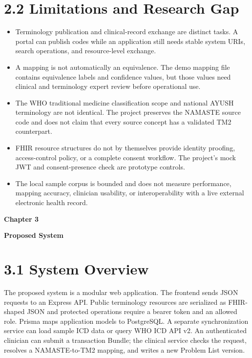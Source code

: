 \documentclass[12pt,a4paper,oneside]{report}
\begin{document}
\section*{2.2 Limitations and Research Gap}
\begin{itemize}
\item Terminology publication and clinical-record exchange are distinct tasks. A portal can publish codes while an application still needs stable system URIs, search operations, and resource-level exchange.
\item A mapping is not automatically an equivalence. The demo mapping file contains equivalence labels and confidence values, but those values need clinical and terminology expert review before operational use.
\item The WHO traditional medicine classification scope and national AYUSH terminology are not identical. The project preserves the NAMASTE source code and does not claim that every source concept has a validated TM2 counterpart.
\item FHIR resource structures do not by themselves provide identity proofing, access-control policy, or a complete consent workflow. The project's mock JWT and consent-presence check are prototype controls.
\item The local sample corpus is bounded and does not measure performance, mapping accuracy, clinician usability, or interoperability with a live external electronic health record.
\end{itemize}
\clearpage
\clearpage\begin{center}\Large\textbf{Chapter 3}\end{center}
\begin{center}\LARGE\textbf{\textbf{Proposed System}}\end{center}\vspace{8pt}
\section*{3.1 System Overview}
The proposed system is a modular web application. The frontend sends JSON requests to an Express API. Public terminology resources are serialized as FHIR-shaped JSON and protected operations require a bearer token and an allowed role. Prisma maps application models to PostgreSQL. A separate synchronization service can load sample ICD data or query WHO ICD API v2. An authenticated clinician can submit a transaction Bundle; the clinical service checks the request, resolves a NAMASTE-to-TM2 mapping, and writes a new Problem List version.
\end{document}
